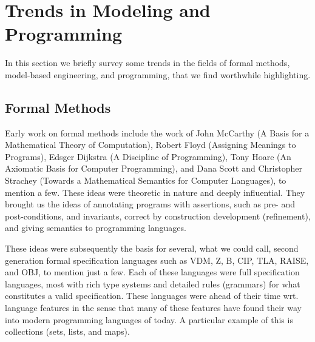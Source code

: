 
\section{Trends in Modeling and Programming}
\label{sec:trends}

In this section we briefly survey some trends in the fields of
formal methods, model-based engineering, and programming, that we find worthwhile highlighting.


\subsection{Formal Methods}

Early work on formal methods include the work of John McCarthy 
(A Basis for a Mathematical Theory of Computation), Robert Floyd (Assigning Meanings to Programs), Edsger 
Dijkstra (A Discipline of Programming), Tony Hoare (An Axiomatic 
Basis for Computer Programming), and Dana Scott and Christopher 
Strachey (Towards a Mathematical Semantics for Computer Languages), 
to mention a few. These ideas were theoretic in nature and deeply 
influential. They brought us the ideas of  annotating programs with 
assertions, such as pre- and post-conditions, and invariants, 
correct by construction development (refinement), and giving 
semantics to programming languages. 

These ideas were subsequently the basis for several, what we could 
call, second generation formal specification languages such as 
VDM, Z, B, CIP, TLA, RAISE, and OBJ, to mention just a few. 
Each of these languages were full 
specification languages, most with rich type systems and detailed rules 
(grammars) for what constitutes a valid specification. These 
languages were ahead of their time wrt. language features in the 
sense that many of these features have found their 
way into modern programming languages of today. A particular
example of this is collections (sets, lists, and maps).

